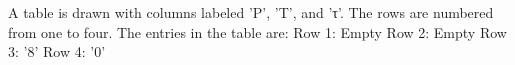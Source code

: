 A table is drawn with columns labeled 'P', 'T', and 'τ'. The rows are numbered from one to four. The entries in the table are:
Row 1: Empty
Row 2: Empty
Row 3: '8'
Row 4: '0'